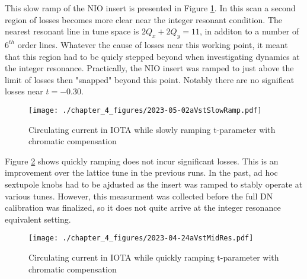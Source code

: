 This slow ramp of the NIO insert is presented in Figure \ref{fig:slowRamp}. In this scan a second region of losses becomes more clear near the integer resonant condition. The nearest resonant line in tune space is $2Q_x + 2Q_y = 11$, in additon to a number of $6^{th}$ order lines. Whatever the cause of losses near this working point, it meant that this region had to be quicly stepped beyond when investigating dynamics at the integer resonance. Practically, the NIO insert was ramped to just above the limit of losses then "snapped" beyond this point. Notably there are no significat losses near $t=-0.30$.

\begin{figure}
	\centering
	\texttt{[image: ./chapter\_4\_figures/2023-05-02aVstSlowRamp.pdf]}
	\caption{Circulating current in IOTA while slowly ramping t-parameter with chromatic compensation}
	\label{fig:slowRamp}
\end{figure}

Figure \ref{fig:fastRamp} shows quickly ramping does not incur significant losses. This is an improvement over the lattice tune in the previous runs. In the past, ad hoc sextupole knobs had to be ajdusted as the insert was ramped to stably operate at various tunes. However, this measurment was collected before the full DN calibration was finalized, so it does not quite arrive at the integer resonance equivalent setting.

\begin{figure}
	\centering
	\texttt{[image: ./chapter\_4\_figures/2023-04-24aVstMidRes.pdf]}
	\caption{Circulating current in IOTA while quickly ramping t-parameter with chromatic compensation}
	\label{fig:fastRamp}
\end{figure}



